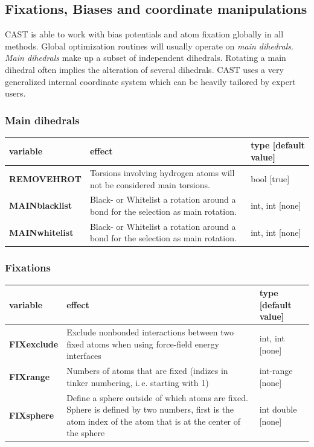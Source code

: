 \documentclass[10pt,a4paper]{article} %
\begin{document}
\subsection{Fixations, Biases and coordinate manipulations}
\ac{CAST} is able to work with bias potentials and atom fixation globally in all methods. Global optimization routines will usually operate on \textit{main dihedrals}. \textit{Main dihedrals} make up a subset of independent dihedrals. Rotating a main dihedral often implies the alteration of several dihedrals. \ac{CAST} uses a very generalized internal coordinate system which can be heavily tailored by expert users.

\subsubsection{Main dihedrals}

\begin{longtable}{|p{3cm}|p{5cm}|p{3cm}|}
	variable & effect & type [default value] \\
	\hline
	\textbf{REMOVEHROT} & Torsions involving hydrogen atoms will not be considered main torsions. & bool [true] \\	
	\textbf{MAINblacklist} & Black- or Whitelist a rotation around a bond for the selection as main rotation. & int, int [none] \\
	\textbf{MAINwhitelist} & Black- or Whitelist a rotation around a bond for the selection as main rotation. & int, int [none] \\
\end{longtable} 

\subsubsection{Fixations}

\begin{longtable}{|p{3cm}|p{5cm}|p{3cm}|}
	variable & effect & type [default value] \\
	\hline
	\textbf{FIXexclude} & Exclude nonbonded interactions between two fixed atoms when using force-field energy interfaces & int, int [none] \\
	\textbf{FIXrange} & Numbers of atoms that are fixed (indizes in tinker numbering, i.\,e. starting with 1) & int-range [none] \\
	\textbf{FIXsphere} & Define a sphere outside of which atoms are fixed. Sphere is defined by two numbers, first is the atom index of the atom that is at the center of the sphere& int double [none] \\
\end{longtable} 
\end{document}
